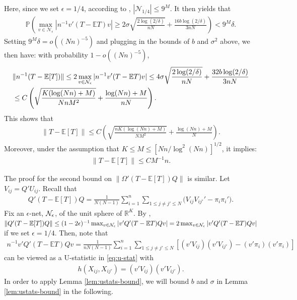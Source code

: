 \documentclass[preprint,11pt]{article}
\newcommand{\mbb}{\mathbb}
\newcommand{\mcal}{\mathcal}
\numberwithin{equation}{section}
\begin{document}
Here, since we set $\epsilon=1/4$, according to \cite[Lemma 5.2]{vershynin2010introduction}, $|\mcal{N}_{1/4}|\le 9^M$. It then yields that
\begin{align*}
    \mbb{P}\left(\max_{v\in\mcal{N}_\epsilon}|n^{-1}v'(T-\mathbb{E}T)v|\ge 2\sigma\sqrt{\frac{2\log(2/\delta)}{nN}}+\frac{16b\log(2/\delta)}{3nN}\right)< 9^M\delta.
\end{align*}
Setting $9^M\delta=o((Nn)^{-5})$ and plugging in the bounds of $b$ and $\sigma^2$ above, we then have: with probability $1-o((Nn)^{-5})$,
\begin{align*}
    &\|n^{-1}(T-\mbb{E}[T])\|\le 2\max_{v\in{\cal N}_\epsilon}|n^{-1}v'(T-\mathbb{E}T)v|\le 4\sigma\sqrt{\frac{2\log(2/\delta)}{nN}}+\frac{32b\log(2/\delta)}{3nN}\\
    &\le C\left(\sqrt{\frac{K(\log (Nn)+M)}{NnM^2}}+\frac{\log (Nn)+M}{nN}\right).
\end{align*}
This shows that
\begin{align*}
    \|T-\mbb{E}[T]\|\le C\left(\sqrt{\frac{nK(\log (Nn)+M)}{NM^2}}+\frac{\log (Nn)+M}{N}\right).
\end{align*}
Moreover, under the assumption that $K\leq M\leq [Nn/\log^2(Nn)]^{1/2}$, it implies:
\begin{align}\label{eventE1}
    \|T-\mbb{E}[T]\|\le CM^{-1}n.
\end{align}

The proof for the second bound on $\|\Omega'(T-\mbb{E}[T])Q\|$ is similar. Let $V_{ij}=Q'U_{ij}$. Recall that
\begin{align*}
    Q'(T-\mathbb{E}[T])Q 
= \frac{1}{N(N-1)}\sum_{i=1}^n \sum_{1\leq j\neq j'\leq N}\bigl(V_{ij}V_{ij'}'  - \pi_i\pi_i'\bigr).
\end{align*}
Fix an $\epsilon$-net, ${\cal N}_\epsilon$, of the unit sphere of $\mathbb{R}^K$. By \cite[Lemma 5.4]{vershynin2010introduction}, $\|Q'(T-\mathbb{E}[T])Q\|\leq (1-2\epsilon)^{-1}\max_{v\in{\cal N}_\epsilon}|v'Q'(T-\mathbb{E}T)Qv|=2\max_{v\in{\cal N}_\epsilon}|v'Q'(T-\mathbb{E}T)Qv|$ if we set $\epsilon=1/4$. Then, note that
\begin{align*}
    n^{-1}v'Q'(T-\mathbb{E}T)Qv=\frac{1}{nN(N-1)}\sum_{i=1}^n \sum_{1\leq j\neq j'\leq N}\left[(v'V_{ij})(v'V_{ij'})-(v'\pi_i)(v'\pi_i)\right]
\end{align*}
can be viewed as a U-statistic in \eqref{eq:u-stat} with
\begin{align*}
    h(X_{ij},X_{ij'})=(v'V_{ij})(v'V_{ij'}).
\end{align*}
In order to apply Lemma \ref{lem:ustats-bound}, we will bound $b$ and $\sigma$ in Lemma \ref{lem:ustats-bound} in the following.
\end{document}
